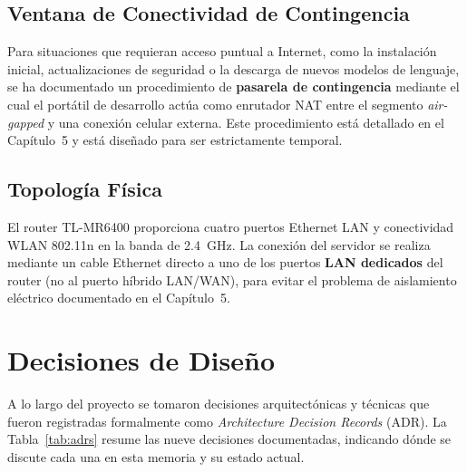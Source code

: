 \subsection{Ventana de Conectividad de Contingencia}

Para situaciones que requieran acceso puntual a Internet, como la instalación inicial, actualizaciones de seguridad o la descarga de nuevos modelos de lenguaje, se ha documentado un procedimiento de \textbf{pasarela de contingencia} mediante el cual el portátil de desarrollo actúa como enrutador NAT entre el segmento \textit{air-gapped} y una conexión celular externa. Este procedimiento está detallado en el Capítulo~5 y está diseñado para ser estrictamente temporal.

\subsection{Topología Física}

El router TL-MR6400 proporciona cuatro puertos Ethernet LAN y conectividad WLAN 802.11n en la banda de 2.4~GHz. La conexión del servidor se realiza mediante un cable Ethernet directo a uno de los puertos \textbf{LAN dedicados} del router (no al puerto híbrido LAN/WAN), para evitar el problema de aislamiento eléctrico documentado en el Capítulo~5.

\section{Decisiones de Diseño}
\label{sec:decisiones_diseno}

A lo largo del proyecto se tomaron decisiones arquitectónicas y técnicas que fueron registradas formalmente como \textit{Architecture Decision Records} (ADR). La Tabla~\ref{tab:adrs} resume las nueve decisiones documentadas, indicando dónde se discute cada una en esta memoria y su estado actual.

